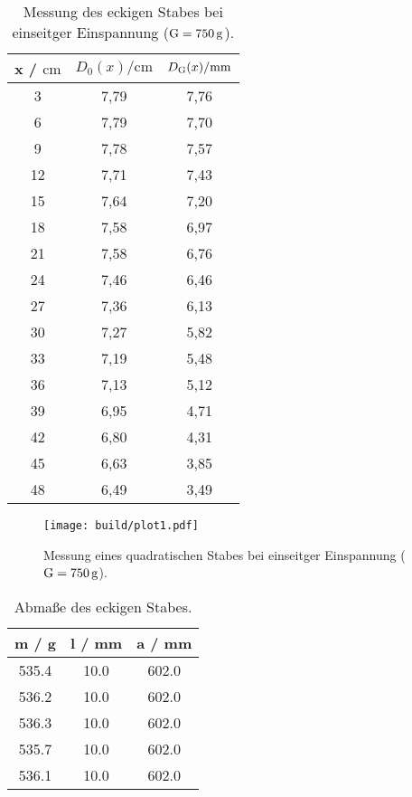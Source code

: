 \sloppy
\begin{table}[H]
  \centering
  \caption{Messung des eckigen Stabes bei einseitger Einspannung ($\text G = \SI{750}{\gram}$).}
  \label{tab:werte1}
  \begin{tabular}{c c c}
    \toprule
    x / $\si{\centi\meter} $ & $ D_0(x) / \si{\centi\meter}$ & $D_{\text G}(x) / \si{\milli\meter}$ \\
    \midrule
    3 & 7,79 & 7,76 \\
    6 & 7,79 & 7,70 \\
    9 & 7,78 & 7,57 \\
    12 & 7,71 & 7,43 \\
    15 & 7,64 & 7,20 \\
    18 & 7,58 & 6,97 \\
    21 & 7,58 & 6,76 \\
    24 & 7,46 & 6,46 \\
    27 & 7,36 & 6,13 \\
    30 & 7,27 & 5,82 \\
    33 & 7,19 & 5,48 \\
    36 & 7,13 & 5,12 \\
    39 & 6,95 & 4,71 \\
    42 & 6,80 & 4,31 \\
    45 & 6,63 & 3,85 \\
    48 & 6,49 & 3,49 \\
    \bottomrule
  \end{tabular}
\end{table}

\sloppy
\begin{figure}
  \centering
  \texttt{[image: build/plot1.pdf]}
  \caption{Messung eines quadratischen Stabes bei einseitger Einspannung ($\text G = \SI{750}{\gram}$).}
  \label{fig:plot1}
\end{figure}

\sloppy
\begin{table}[H]
  \centering
  \caption{Abmaße des eckigen Stabes.}
  \label{tab:eckigStab}
  \begin{tabular}{c c c}
    \toprule
    m / g & l / mm & a / mm \\
    \midrule
    535.4 & 10.0 & 602.0 \\
    536.2 & 10.0 & 602.0 \\
    536.3 & 10.0 & 602.0 \\
    535.7 & 10.0 & 602.0 \\
    536.1 & 10.0 & 602.0 \\
    \bottomrule
  \end{tabular}
\end{table}

